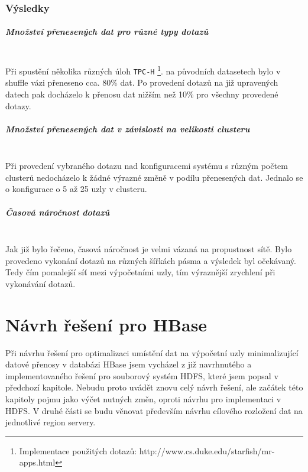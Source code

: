 \documentclass[thesis=M,czech]{FITthesis}[2012/06/26]
\begin{document}
\subsection{Výsledky}

\paragraph{Množství přenesených dat pro různé typy dotazů} \hfill \\
Při spustění několika různých úloh \texttt{TPC-H} \footnote{Implementace použitých dotazů: http://www.cs.duke.edu/starfish/mr-apps.html}.  na původních datasetech bylo v shuffle vázi přeneseno cca. 80\% dat. Po provedení dotazů na již upravených datech pak docházelo k přenosu dat  nižším než 10\% pro všechny provedené dotazy.

\paragraph{Množství přenesených dat v závislosti na velikosti clusteru} \hfill \\
Při provedení vybraného dotazu nad konfiguracemi systému s různým počtem clusterů nedocházelo k žádné výrazné změně v podílu přenesených dat. Jednalo se o konfigurace o 5 až 25 uzly v clusteru.

\paragraph{Časová náročnost dotazů} \hfill \\
Jak již bylo řečeno, časová náročnost je velmi vázaná na propustnost sítě. Bylo provedeno vykonání dotazů na různých šířkách pásma a výsledek byl očekávaný. Tedy čím pomalejší síť mezi výpočetními uzly, tím výraznější zrychlení při vykonávání dotazů.






\chapter{Návrh řešení pro HBase}
Při návrhu řešení pro optimalizaci umístění dat na výpočetní uzly minimalizující datové přenosy v databázi HBase jsem vycházel z již navrhnutého a implementovaného řešení pro souborový systém HDFS, které jsem popsal v předchozí kapitole. Nebudu proto uvádět znovu celý návrh řešení, ale začátek této kapitoly pojmu jako výčet nutných změn, oproti návrhu pro implementaci v HDFS. V druhé části se budu věnovat především návrhu cílového rozložení dat na jednotlivé region servery.
\end{document}
